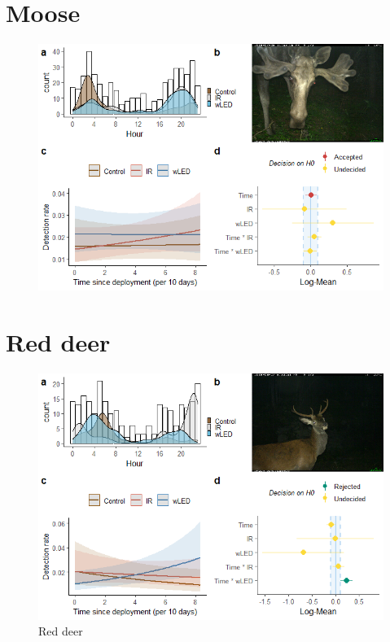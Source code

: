 \begin{table}[ht]
\newpage
\section{Moose}

\begin{figure}
		  \centering
	\includegraphics[scale=.9]{../R/glmm_sp_files/figure-html/elg2-1.png}

\end{figure}




\newpage
\section{Red deer}

\begin{figure}
		  \centering
	\includegraphics[scale=.9]{../R/glmm_sp_files/figure-html/hjort2-1.png}
\caption[Red deer]
{Red deer}
\end{figure}







\end{table}

